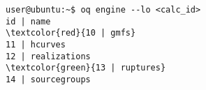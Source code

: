 \begin{Verbatim}[frame=single, commandchars=\\\{\}, fontsize=\small]
user@ubuntu:~$ oq engine --lo <calc_id>
id | name
\textcolor{red}{10 | gmfs}
11 | hcurves
12 | realizations
\textcolor{green}{13 | ruptures}
14 | sourcegroups
\end{Verbatim}
